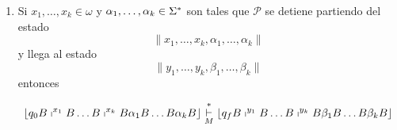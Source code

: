 \begin{frame}
  \begin{alertblock}{}
      \begin{enumerate}[3)]
        \item Si $x_{1}, \dotsc, x_{k} \in \omega$ y $\alpha_{1}, \dotsc, \alpha_{k} \in \Sigma^{\ast}$ son tales que
        $\mathcal{P}$ se detiene partiendo del estado
        \begin{equation*}
          \lVert x_{1}, \dotsc, x_{k}, \alpha_{1}, \dotsc, \alpha_{k} \rVert
        \end{equation*}
        \PN y llega al estado
        \begin{equation*}
          \lVert y_{1}, \dotsc, y_{k}, \beta_{1}, \dotsc, \beta_{k} \rVert
        \end{equation*}
        \PN entonces

        \normLetter
        \begin{equation*}
          \left\lfloor q_{0} B \shortmid^{x_{1}} B \dotsc B \shortmid^{x_{k}} B \alpha_{1} B \dotsc B \alpha_{k} B
          \right\rfloor \overset{\ast}{\underset{M}{\vdash}} \left\lfloor q_{f} B \shortmid^{y_{1}} B \dotsc B
          \shortmid^{y_{k}} B \beta_{1} B \dotsc B \beta_{k} B \right\rfloor
        \end{equation*}
      \end{enumerate}
  \end{alertblock}
\end{frame}
